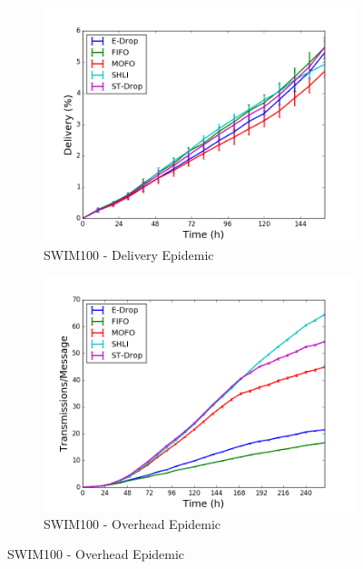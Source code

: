 \begin{figure}
    \begin{subfigure}[b]{0.5\columnwidth}
        \includegraphics[width=\linewidth]{imgs/swim/100/Epidemic-delivery.png}
        \caption{SWIM100 - Delivery Epidemic}
        \label{fig:swim100EpidemicDel}
    \end{subfigure}
    \hfill %
    \begin{subfigure}[b]{0.5\columnwidth}
        \includegraphics[width=\linewidth]{imgs/swim/100/Epidemic-overhead.png}
        \caption{SWIM100 - Overhead Epidemic}
        \label{fig:swim100EpidemicOver}
    \end{subfigure}


\end{figure}
